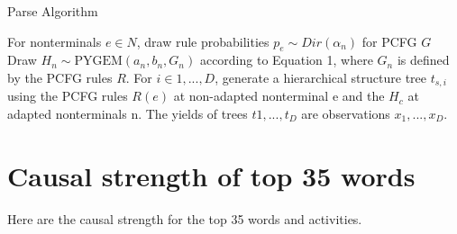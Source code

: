 \begin{algorithm}[h]
        \scriptsize
        \caption{Parse Algorithm}\label{alg:pa}
        \begin{algorithmic}[1]
                \State For nonterminals $e \in N$, draw rule probabilities $p_{e} \sim Dir(\alpha_{n})$ for PCFG $G$
                \State Draw $H_{n} \sim \text{PYGEM}(a_{n}, b_{n}, G_{n})$ according to Equation 1, where $G_{n}$ is defined by the PCFG rules $R$.
                \EndFor
                \State For $i \in {1, ..., D}$, generate a hierarchical structure tree $t_{s, i}$ using the PCFG rules $R(e)$ at non-adapted nonterminal e and the $H_{c}$ at adapted nonterminals n.
                \State The yields of trees $t1, ..., t_{D}$ are observations $x_{1}, ..., x_{D}$.

        \end{algorithmic}
\end{algorithm}

\section{Causal strength of top 35 words}
\label{sec:top}
Here are the causal strength for the top 35 words and activities.

